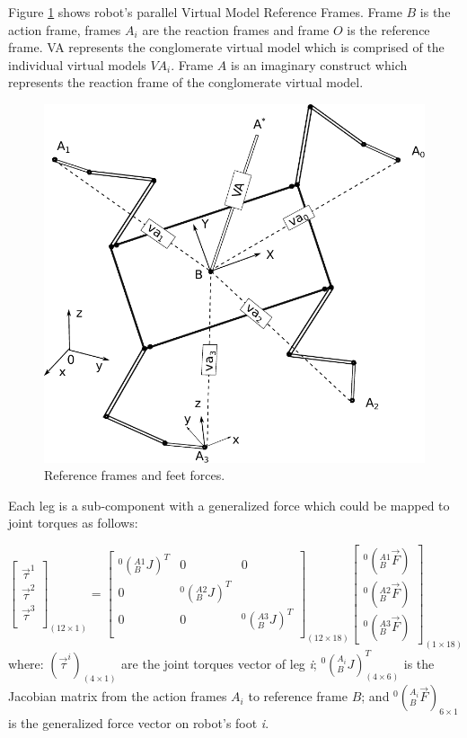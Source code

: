 \documentclass[]{article}
\begin{document}
Figure \ref{fig:guaravirtualactuators} shows robot's  parallel Virtual Model Reference Frames. Frame $B$ is the action frame, frames $A_i$ 
are the reaction frames and frame $O$ is the reference frame. VA represents the conglomerate virtual model which is comprised of the individual virtual models $VA_i$. Frame $A$ is an imaginary construct which represents the reaction frame of the conglomerate virtual model.
\begin{figure}%
	\centering
	\includegraphics[scale=0.4]{"Figuras/GuaraVirtualActuators"}
	\caption{Reference frames and feet forces.}
	\label{fig:guaravirtualactuators}
\end{figure}
Each leg is a sub-component with a generalized force which could be mapped to joint torques as follows:

\begin{equation}
\begin{bmatrix}
	\vec{\tau}^1 \\
	\vec{\tau}^2 \\
	\vec{\tau}^3 \\
\end{bmatrix}_{(12\times1)}
=
\begin{bmatrix}
	^0(_B^{A1}J)^T  & 0 				& 0  				\\ 
		0  			& ^0(_B^{A2}J)^T 	&   				\\ 
		0 			& 0 				&^0(_B^{A3}J)^T 	\\ 
\end{bmatrix}_{(12 \times 18)}
\begin{bmatrix}
	^0(_B^{A1}\vec{F}) 	\\
	^0(_B^{A2}\vec{F}) 	\\
	^0(_B^{A3}\vec{F})
\end{bmatrix}_{(1 \times 18)}
\label{eq:parallelVirtualModelEquation}
\end{equation}
where: $(\vec{\tau}^i)_{(4\times1)}$ are the joint torques vector of leg \textit{i}; $^0(_B^{A_i}J)^T_{(4\times6)}$ is the Jacobian matrix from the action frames $A_i$ to reference frame $B$; and $^0(_B^{A_i}\vec{F})_{6\times1}$ is the generalized force vector on robot's foot \textit{i}.\\
\end{document}
